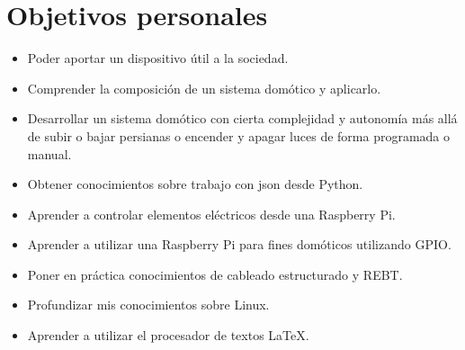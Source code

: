 \section{Objetivos personales}
\begin{itemize}
    \item Poder aportar un dispositivo útil a la sociedad.
    \item Comprender la composición de un sistema domótico y aplicarlo.
    \item Desarrollar un sistema domótico con cierta complejidad y autonomía más allá de subir o bajar persianas o encender y apagar luces de forma programada o manual.
    \item Obtener conocimientos sobre trabajo con json desde Python.
    \item Aprender a controlar elementos eléctricos desde una Raspberry Pi.
    \item Aprender a utilizar una Raspberry Pi para fines domóticos utilizando GPIO.
    \item Poner en práctica conocimientos de cableado estructurado y REBT.
    \item Profundizar mis conocimientos sobre Linux.
    \item Aprender a utilizar el procesador de textos \LaTeX.
\end{itemize}
